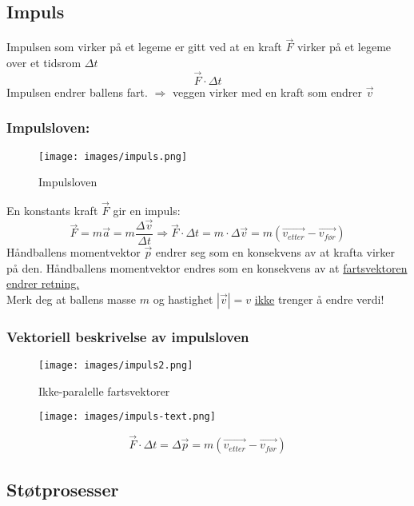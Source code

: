 \documentclass[12pt]{article}
\begin{document}
\pagebreak
\subsection{Impuls}
Impulsen som virker på et legeme er gitt ved at en kraft $\Vec{F}$ virker på et legeme over et tidsrom $\Delta t$
$$\Vec{F}\cdot \Delta t$$
Impulsen endrer ballens fart. $\Rightarrow$ veggen virker med en kraft som endrer $\Vec{v}$

\subsubsection{\textbf{Impulsloven:}}
\begin{figure} [H]
    \centering
    \texttt{[image: images/impuls.png]}
    \caption{Impulsloven}
\end{figure}
En konstants kraft $\Vec{F}$ gir en impuls:
$$\Vec{F} = m\Vec{a} = m\frac{\Delta\Vec{v}}{\Delta t} \Rightarrow \Vec{F}\cdot\Delta t = m\cdot\Delta\Vec{v} = m(\Vec{v_{etter}} - \Vec{v_{før}})$$
Håndballens momentvektor $\Vec{p}$ endrer seg som en konsekvens av at krafta virker på den.
Håndballens momentvektor endres som en konsekvens av at \underline{fartsvektoren endrer retning.}\\
\bigskip
\color{blue}
Merk deg at ballens masse $m$ og hastighet $|\Vec{v}| = v$ \underline{ikke} trenger å endre verdi!
\color{black}
\pagebreak
\subsubsection{Vektoriell beskrivelse av impulsloven}
\begin{figure} [H]
    \centering
    \texttt{[image: images/impuls2.png]}
    \caption{Ikke-paralelle fartsvektorer}
\end{figure}
\begin{figure} [H]
    
    \texttt{[image: images/impuls-text.png]}
\end{figure}

$$\Vec{F}\cdot \Delta t = \Delta \Vec{p} = m(\Vec{v_{etter}} - \Vec{v_{før}})$$


\subsection{Støtprosesser}
\bigskip
\end{document}
